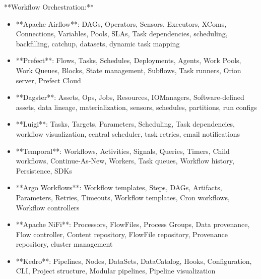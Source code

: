 \documentclass[11pt,a4paper]{article}
\begin{document}
**Workflow Orchestration:**

\begin{itemize}
\item **Apache Airflow**: DAGs, Operators, Sensors, Executors, XComs, Connections, Variables, Pools, SLAs, Task dependencies, scheduling, backfilling, catchup, datasets, dynamic task mapping
\end{itemize}

\begin{itemize}
\item **Prefect**: Flows, Tasks, Schedules, Deployments, Agents, Work Pools, Work Queues, Blocks, State management, Subflows, Task runners, Orion server, Prefect Cloud
\end{itemize}

\begin{itemize}
\item **Dagster**: Assets, Ops, Jobs, Resources, IOManagers, Software-defined assets, data lineage, materialization, sensors, schedules, partitions, run configs
\end{itemize}

\begin{itemize}
\item **Luigi**: Tasks, Targets, Parameters, Scheduling, Task dependencies, workflow visualization, central scheduler, task retries, email notifications
\end{itemize}

\begin{itemize}
\item **Temporal**: Workflows, Activities, Signals, Queries, Timers, Child workflows, Continue-As-New, Workers, Task queues, Workflow history, Persistence, SDKs
\end{itemize}

\begin{itemize}
\item **Argo Workflows**: Workflow templates, Steps, DAGs, Artifacts, Parameters, Retries, Timeouts, Workflow templates, Cron workflows, Workflow controllers
\end{itemize}

\begin{itemize}
\item **Apache NiFi**: Processors, FlowFiles, Process Groups, Data provenance, Flow controller, Content repository, FlowFile repository, Provenance repository, cluster management
\end{itemize}

\begin{itemize}
\item **Kedro**: Pipelines, Nodes, DataSets, DataCatalog, Hooks, Configuration, CLI, Project structure, Modular pipelines, Pipeline visualization
\end{itemize}
\end{document}

